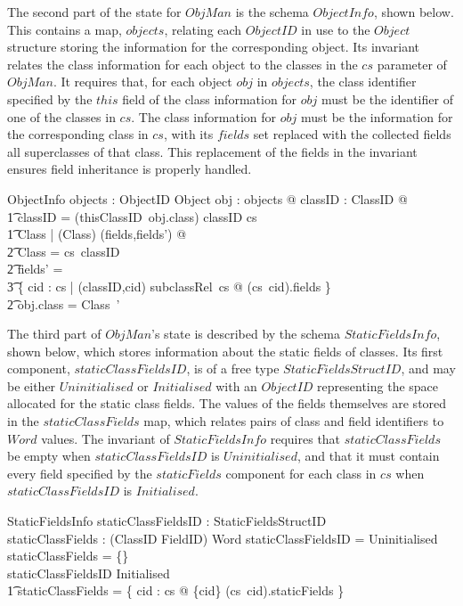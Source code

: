 The second part of the state for $ObjMan$ is the schema $ObjectInfo$,
shown below.
This contains a map, $objects$, relating each $ObjectID$ in use to the
$Object$ structure storing the information for the corresponding
object.
Its invariant relates the class information for each object to the
classes in the $cs$ parameter of $ObjMan$.
It requires that, for each object $obj$ in $objects$, the class
identifier specified by the $this$ field of the class information for
$obj$ must be the identifier of one of the classes in $cs$.
The class information for $obj$ must be the information for the
corresponding class in $cs$, with its $fields$ set replaced with the
collected fields all superclasses of that class.
This replacement of the fields in the invariant ensures field
inheritance is properly handled.
\begin{schema}{ObjectInfo}
	objects : ObjectID \pfun Object
\where
	\forall obj : \ran objects @ \exists classID : ClassID @ \\
	\t1 classID = (thisClassID~obj.class) \land classID \in \dom cs \land \\
	\t1 \exists \Delta Class | (\Xi Class) \hide (fields,fields') @ \\
	\t2 \theta Class = cs~classID \land \\
	\t2 fields' = {} \\
	\t3 \bigcup \{ cid : \dom cs | (classID,cid) \in subclassRel~cs @ (cs~cid).fields \} \land \\
	\t2 obj.class = \theta Class~'
\end{schema}
      
The third part of $ObjMan$'s state is described by the schema
$StaticFieldsInfo$, shown below, which stores information about the
static fields of classes.
Its first component, $staticClassFieldsID$, is of a free type
$StaticFieldsStructID$, and may be either $Uninitialised$ or
$Initialised$ with an $ObjectID$ representing the space allocated for
the static class fields.
The values of the fields themselves are stored in the
$staticClassFields$ map, which relates pairs of class and field
identifiers to $Word$ values.
The invariant of $StaticFieldsInfo$ requires that $staticClassFields$
be empty when $staticClassFieldsID$ is $Uninitialised$, and that it
must contain every field specified by the $staticFields$ component for
each class in $cs$ when $staticClassFieldsID$ is $Initialised$.
\begin{schema}{StaticFieldsInfo}
	staticClassFieldsID : StaticFieldsStructID \\
	staticClassFields : (ClassID \cross FieldID) \pfun Word
\where
	staticClassFieldsID = Uninitialised \implies staticClassFields = \{\} \\
	staticClassFieldsID \in \ran Initialised \implies {} \\
	\t1 \dom staticClassFields = \bigcup \{ cid : \dom cs @ \{cid\} \cross (cs~cid).staticFields \}
\end{schema}

